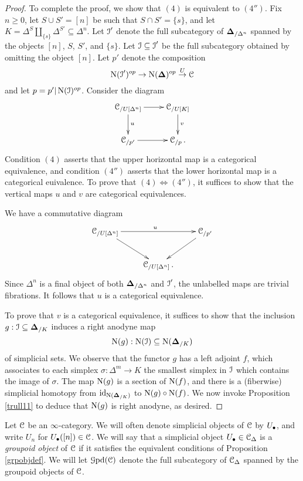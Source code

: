 \begin{proof}
To complete the proof, we show that $(4)$ is equivalent to $(4'')$.  
Fix $n \geq 0$, let $S \cup S' = [n]$ be such that $S \cap S' = \{s\}$, and let
$K = \Delta^{S} \amalg_{ \{s\} } \Delta^{S'} \subseteq \Delta^n$.
Let
$\operatorname{\mathcal{I}}'$ denote the full subcategory of $\operatorname{{\bf \Delta}}_{/\Delta^n}$ spanned by the objects
$[n]$, $S$, $S'$, and $\{s\}$. Let $\operatorname{\mathcal{I}} \subseteq \operatorname{\mathcal{I}}'$ be the full subcategory obtained by omitting the object $[n]$. Let $p'$ denote the composition
$$ \operatorname{N}(\operatorname{\mathcal{I}}')^{op} \rightarrow \operatorname{N}(\operatorname{{\bf \Delta}})^{op} \stackrel{U}{\rightarrow} \operatorname{\mathcal{C}}$$ and let
$p = p' | \operatorname{N}(\operatorname{\mathcal{I}})^{op}$. 
Consider the diagram
$$ \xymatrix{ \calC_{/U[\Delta^n]} \ar[r] \ar[d]^{u} & \calC_{/U[K]} \ar[d]^{v} \\
\calC_{/p'} \ar[r] & \calC_{/p}. }$$ 
Condition $(4)$ asserts that the upper horizontal map is a categorical equivalence, and condition $(4'')$ asserts that the lower horizontal map is a categorical euivalence. To prove that
$(4) \Leftrightarrow (4'')$, it suffices to show that the vertical maps $u$ and $v$ are categorical equivalences.

We have a commutative diagram
$$ \xymatrix{ \calC_{/U[\Delta^n]} \ar[rr]^{u} \ar[dr] & & \calC_{/p'} \ar[dl] \\
& \calC_{/U[\Delta^n]}.& }$$
Since $\Delta^n$ is a final object of both $\operatorname{{\bf \Delta}}_{/\Delta^n}$ and $\operatorname{\mathcal{I}}'$, the unlabelled maps are trivial fibrations. It follows that $u$ is a categorical equivalence.

To prove that $v$ is a categorical equivalence, it suffices to show that the inclusion
$g: \operatorname{\mathcal{I}} \subseteq \operatorname{{\bf \Delta}}_{/K}$ induces a right anodyne map
$$\operatorname{N}(g): \operatorname{N}(\operatorname{\mathcal{I}}) \subseteq \operatorname{N}(\operatorname{{\bf \Delta}}_{/K})$$ of simplicial sets. We observe that the functor $g$ has a left adjoint $f$, which associates to each simplex $\sigma: \Delta^m \rightarrow
K$ the smallest simplex in $\operatorname{\mathcal{I}}$ which contains the image of $\sigma$. 
The map $\operatorname{N}(g)$ is a section of $\operatorname{N}(f)$, and there is a (fiberwise) simplicial homotopy from
$\operatorname{id}_{ \operatorname{N}(\operatorname{{\bf \Delta}}_{/K}) }$ to $\operatorname{N}(g) \circ \operatorname{N}(f)$. We now invoke Proposition \ref{trull11} to deduce that $\operatorname{N}(g)$ is right anodyne, as desired.
\end{proof}

\begin{definition}
Let $\operatorname{\mathcal{C}}$ be an $\infty$-category. We will often denote simplicial objects of $\operatorname{\mathcal{C}}$ by
$U_{\bullet}$, and write $U_{n}$ for $U_{\bullet}([n]) \in \operatorname{\mathcal{C}}$. We will say that a simplicial object $U_{\bullet} \in \operatorname{\mathcal{C}}_{\Delta}$ is a {\em groupoid object} of $\operatorname{\mathcal{C}}$ if it satisfies the equivalent conditions of Proposition \ref{grpobjdef}. We will let $\operatorname{\mathcal{G}pd}(\operatorname{\mathcal{C}})$ denote the full subcategory of $\operatorname{\mathcal{C}}_{\Delta}$ spanned by the groupoid objects of $\operatorname{\mathcal{C}}$.
\end{definition}

